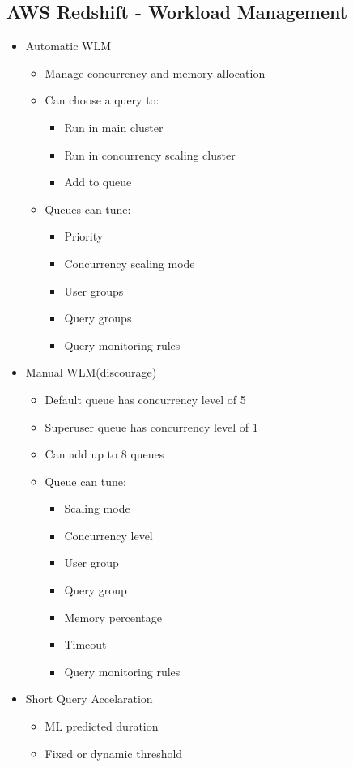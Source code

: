\documentclass[../main.tex]{subfiles}
\begin{document}
\subsection{AWS Redshift - Workload Management}
\begin{itemize}
    \item Automatic WLM
    \begin{itemize}
        \item Manage concurrency and memory allocation
        \item Can choose a query to:
        \begin{itemize}
            \item Run in main cluster
            \item Run in concurrency scaling cluster
            \item Add to queue
        \end{itemize}
        \item Queues can tune:
        \begin{itemize}
            \item Priority
            \item Concurrency scaling mode
            \item User groups
            \item Query groups
            \item Query monitoring rules
        \end{itemize}
    \end{itemize}
    \item Manual WLM(discourage)
    \begin{itemize}
        \item Default queue has concurrency level of 5
        \item Superuser queue has concurrency level of 1
        \item Can add up to 8 queues
        \item Queue can tune:
        \begin{itemize}
            \item Scaling mode
            \item Concurrency level
            \item User group
            \item Query group
            \item Memory percentage
            \item Timeout
            \item Query monitoring rules
        \end{itemize}
    \end{itemize}
    \item Short Query Accelaration
    \begin{itemize}
        \item ML predicted duration
        \item Fixed or dynamic threshold
    \end{itemize}
\end{itemize}
\end{document}
